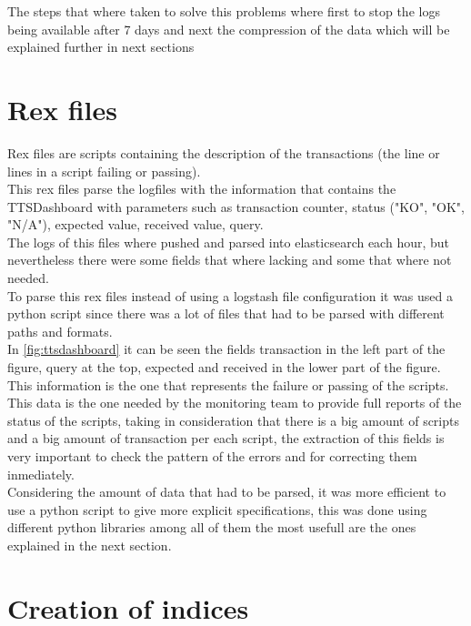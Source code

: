 The steps that where taken to solve this problems where first to stop the logs being available after 7 days and next the compression of the data which will be explained further in next sections 


\section{Rex files}

Rex files are scripts containing the description of the transactions (the line or lines in a script failing or passing).
\\

This rex files parse the logfiles with the information that contains the TTSDashboard with parameters such as transaction counter, status ("KO", "OK", "N/A"), expected value, received value, query.
\\

The logs of this files where pushed and parsed into elasticsearch each hour, but nevertheless there were some fields that where lacking and some that where not needed.
\\

To parse this rex files instead of using a logstash file configuration it was used a python script since there was a lot of files that had to be parsed with different paths and formats.
\\

In \autoref{fig:ttsdashboard} it can be seen the fields transaction in the left part of the figure, query at the top, expected and received in the lower part of the figure. This  information is the one that represents the failure or passing of the scripts.
\\

This data is the one needed by the monitoring team to provide full reports of the status of the scripts, taking in consideration that there is a big amount of scripts and a big amount of transaction per each script, the extraction of this fields is very important to check the pattern of the errors and for correcting them inmediately.
\\

Considering the amount of data that had to be parsed, it was more efficient to use a python script to give more explicit specifications, this was done using different python libraries among all of them the most usefull are the ones explained in the next section.

\section{Creation of indices}

